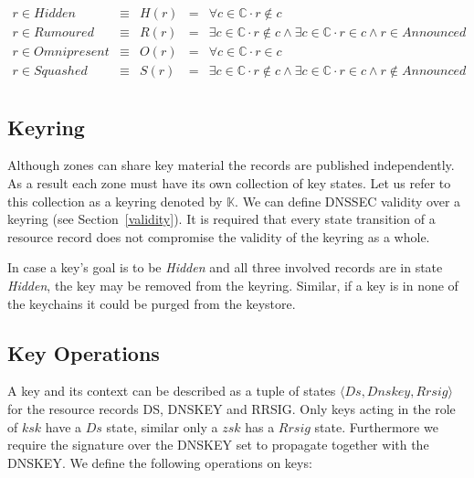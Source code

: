 \documentclass[twoside,english, a4paper]{article}
\begin{document}
\begin{displaymath}
\begin{array}{lllll}
       r\in Hidden      & \equiv & H(r) &=& \forall c \in \mathbb{C} \cdot r \not \in c \\
       r\in Rumoured    & \equiv & R(r) &=& \exists c \in \mathbb{C} \cdot r \not \in c \wedge \exists c \in \mathbb{C} \cdot r\in c \wedge r\in Announced\\
       r\in Omnipresent & \equiv & O(r) &=& \forall c \in \mathbb{C} \cdot r \in c \\
       r\in Squashed    & \equiv & S(r) &=& \exists c \in \mathbb{C} \cdot r \not \in c \wedge \exists c \in \mathbb{C} \cdot r \in c \wedge r \notin Announced \\
\end{array}
\end{displaymath}

\subsection{Keyring}

Although zones can share key material the records are published 
independently. As a result each zone must have its own collection of
key states. Let us refer to this collection as a keyring denoted 
by $\mathbb{K}$. We can
define DNSSEC validity over a keyring (see Section~\ref{validity}).
It is required that every state transition of a resource record does 
not compromise the validity of the keyring as a whole.

In case a key's goal is to be \emph{Hidden} and all three involved
records are in state \emph{Hidden}, the key may be removed from the
keyring. Similar, if a key is in none of the keychains it could be
purged from the keystore.

\subsection{Key Operations}

A key and its context can be described as a tuple of states $\langle 
Ds,Dnskey,Rrsig\rangle$ for the resource records DS, DNSKEY and RRSIG.
Only keys acting in the role of $ksk$ have a $Ds$ state, similar
only a $zsk$ has a $Rrsig$ state. Furthermore we require the signature
over the DNSKEY set to propagate together with the DNSKEY.
We define the following operations on keys:
\end{document}
